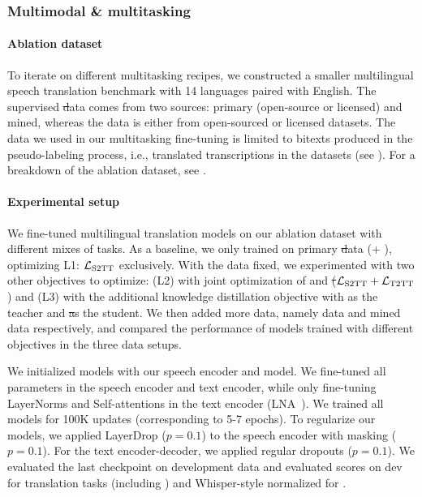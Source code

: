 \subsubsection{Multimodal \& multitasking \xt}\label{sec:modeling:ablation:multitask}
\paragraph{Ablation dataset}
To iterate on different multitasking recipes, we constructed a smaller multilingual speech translation benchmark with 14 languages paired with English. 
The supervised \st data comes from two sources: primary (open-source or licensed) and mined, whereas the \asr data is either from open-sourced or licensed datasets.
The \mt data we used in our multitasking fine-tuning is limited to bitexts produced in the pseudo-labeling process, i.e., translated transcriptions in the \asr datasets (see ).  
For a breakdown of the ablation dataset, see .




\paragraph{Experimental setup}
We fine-tuned multilingual translation models on our ablation dataset with different mixes of tasks.
As a baseline, we only trained on primary \st data (\engx + \xeng), optimizing L1: $\mathcal L_\text{{S2TT}}$ exclusively.
With the data fixed, we experimented with two other objectives to optimize: (L2) with joint optimization of \mt and \st ($\mathcal L_\text{{S2TT}}+\mathcal L_\text{{T2TT}}$) and (L3) with the additional knowledge distillation objective with \mt as the teacher and \st as the student.
We then added more data, namely \asr data and mined data respectively, and compared the performance of models trained with different objectives in the three data setups.

We initialized \xt models with our \wvbert speech encoder and  \nllbv \mt model. We fine-tuned all parameters in the speech encoder and text encoder, while only fine-tuning LayerNorms and Self-attentions in the text encoder (LNA~\citep{li2020multilingual}). We trained all models for 100K updates (corresponding to 5-7 epochs). To regularize our models, we applied LayerDrop ($p{=}0.1$) to the speech encoder with masking ($p{=}0.1$). For the text encoder-decoder, we applied regular dropouts ($p=0.1$). We evaluated the last checkpoint on development data and evaluated \bleu scores on \fleurs dev for translation tasks (including \mt) and Whisper-style normalized \wer for \asr.
